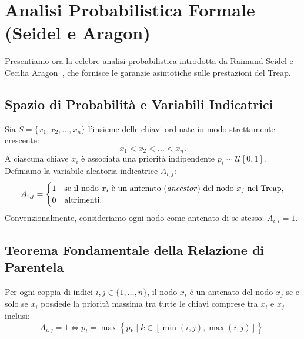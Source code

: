\FloatBarrier
\section{Analisi Probabilistica Formale (Seidel e Aragon)}
\label{sec:probabilistic-analysis}

Presentiamo ora la celebre analisi probabilistica introdotta da Raimund Seidel e Cecilia Aragon~\cite{seidel1996}, che fornisce le garanzie asintotiche sulle prestazioni del Treap.

\FloatBarrier
\subsection{Spazio di Probabilit\`a e Variabili Indicatrici}
Sia $S = \{x_1, x_2, \dots, x_n\}$ l'insieme delle chiavi ordinate in modo strettamente crescente:
\begin{equation}
  x_1 < x_2 < \dots < x_n.
\end{equation}
A ciascuna chiave $x_i$ \`e associata una priorit\`a indipendente $p_i \sim \mathcal{U}[0, 1]$.
Definiamo la variabile aleatoria indicatrice $A_{i, j}$:
\begin{equation}
  A_{i, j} = \begin{cases}
    1 & \text{se il nodo $x_i$ \`e un antenato (\textit{ancestor}) del nodo $x_j$ nel Treap,} \\
    0 & \text{altrimenti.}
  \end{cases}
\end{equation}
Convenzionalmente, consideriamo ogni nodo come antenato di se stesso: $A_{i, i} = 1$.

\FloatBarrier
\subsection{Teorema Fondamentale della Relazione di Parentela}

\begin{theorem}
\label{thm:ancestor-condition}
Per ogni coppia di indici $i, j \in \{1, \dots, n\}$, il nodo $x_i$ \`e un antenato del nodo $x_j$ se e solo se $x_i$ possiede la priorit\`a massima tra tutte le chiavi comprese tra $x_i$ e $x_j$ inclusi:
\begin{equation}
  A_{i, j} = 1 \iff p_i = \max \left\{ p_k \mid k \in [\min(i, j), \max(i, j)] \right\}.
\end{equation}
\end{theorem}

